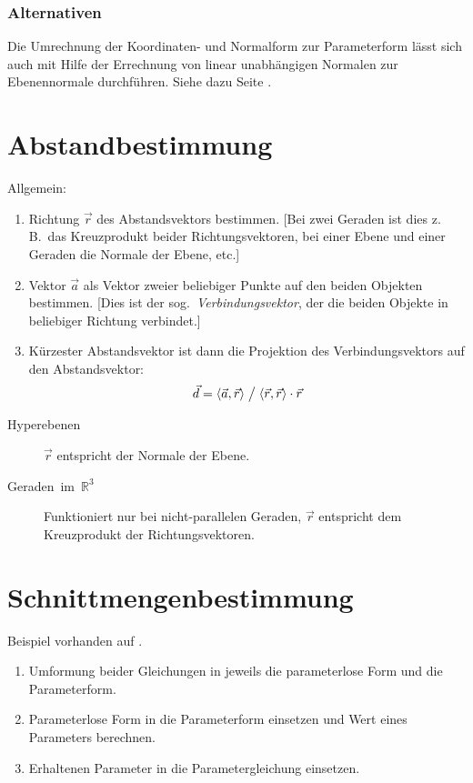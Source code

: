\subsubsection*{Alternativen}

Die Umrechnung der Koordinaten- und Normalform zur Parameterform lässt sich auch mit Hilfe der Errechnung von linear unabhängigen Normalen zur Ebenennormale durchführen.
Siehe dazu Seite \pageref{sub:Errechnung-von-Normalen}.



\section{Abstandbestimmung}


Allgemein:
\begin{enumerate}
  \item Richtung $\vec r$ des Abstandsvektors bestimmen.
        [Bei zwei Geraden ist dies z.\,B.~das Kreuzprodukt beider Richtungsvektoren, bei einer Ebene und einer Geraden die Normale der Ebene, etc\@.]
  \item Vektor $\vec a$ als Vektor zweier beliebiger Punkte auf den beiden Objekten bestimmen.
        [Dies ist der sog.~\emph{Verbindungsvektor}, der die beiden Objekte in beliebiger Richtung verbindet.]
  \item Kürzester Abstandsvektor ist dann die Projektion des Verbindungsvektors auf den Abstandsvektor:
	\[ \vec d = \langle \vec a, \vec r \rangle \bigm/ \langle \vec r, \vec r \rangle \cdot \vec r \]
\end{enumerate}

\begin{description}
  \item [{Hyperebenen}]
	$\vec{r}$ entspricht der Normale der Ebene.
  \item [{Geraden~im~$\mathbb{R}^{3}$}]
	Funktioniert nur bei nicht-parallelen Geraden, $\vec{r}$ entspricht dem Kreuzprodukt der Richtungsvektoren.
\end{description}

\pagebreak[2]
\section{Schnittmengenbestimmung}

\CheckedBox{} Beispiel vorhanden auf .
\begin{enumerate}
  \item {}Umformung beider Gleichungen in jeweils die parameterlose Form und die Parameterform.
  \item Parameterlose Form in die Parameterform einsetzen und Wert eines Parameters berechnen.
  \item Erhaltenen Parameter in die Parametergleichung einsetzen.
\end{enumerate}

